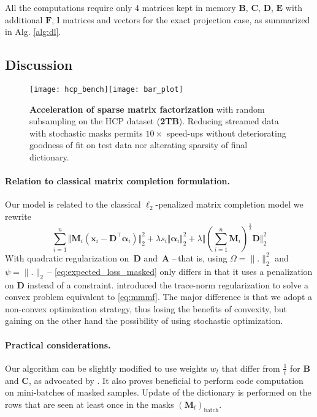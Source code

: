 \documentclass{article}
\def\EE{{\mathbf E}}
\def\x{{\mathbf x}}
\def\A{{\mathbf A}}
\def\B{{\mathbf B}}
\def\C{{\mathbf C}}
\def\F{{\mathbf F}}
\def\D{{\mathbf D}}
\def\x{{\mathbf x}}
\def\M{{\mathbf M}}
\newcommand{\transpose}{^\top}
\newcommand{\balpha}{\boldsymbol{\alpha}}
\begin{document}
All the computations require only 4 matrices kept in memory
$\B$, $\C$, $\D$, $\EE$ with additional $\F$, $\mathbf l$ matrices and vectors for the exact
projection case, as summarized in Alg. \ref{alg:dl}.

\subsection{Discussion}
\label{sec:discussion}

\begin{figure*}[t]
  \centering
  \texttt{[image: hcp\_bench]}\texttt{[image: bar\_plot]}
  \caption{ \textbf{Acceleration of sparse matrix factorization} with random subsampling on the HCP dataset (\textbf{2TB}). Reducing streamed data with stochastic masks permits $10\times$ speed-ups without deteriorating goodness of fit on test data nor alterating sparsity of final dictionary.} \label{fig:hcp_curve}
   \vspace{-.8em}
\end{figure*}

\paragraph{Relation to classical matrix completion formulation.}
Our model
is related to the classical $\ell_2$-penalized matrix completion model \citep[\textit{e.g.}][]{bell_lessons_2007} we rewrite
\begin{equation}
\sum_{i=1}^n\Vert \M_i (\x_i -\D\transpose\balpha_i\!)
\Vert_2^2 + \lambda s_i \Vert \balpha_i \Vert_2^2 + \lambda \Vert
(\sum_{i=1}^n \M_i)^{\frac{1}{2}} \D \Vert_2^2
	\label{eq:mmmf}
\end{equation}
With quadratic regularization on~$\D$ and~$\A$ --\,that is, using
$\Omega=\|.\|_2^2$ and~$\psi=\|.\|_2$\,-- \eqref{eq:expected_loss_masked} only
differs in that it uses a penalization on $\D$ instead of a constraint. \citet{srebro_maximum-margin_2004}
 introduced the trace-norm regularization to solve a convex problem equivalent to \eqref{eq:mmmf}.
The major difference is that we adopt a non-convex optimization strategy, thus
losing the benefits of convexity, but gaining on the other hand the possibility
of using stochastic optimization.




\paragraph{Practical considerations.} Our algorithm can be slightly modified to use
weights $w_t$ that differ from $\frac{1}{t}$ for $\B$ and $\C$, as advocated by \citet{mairal_stochastic_2013}.
It also proves beneficial to perform code computation on mini-batches of masked
samples. Update of the dictionary is performed on the rows that are seen at
least once in the masks $(\M_t)_{\textrm{batch}}$.
\end{document}
